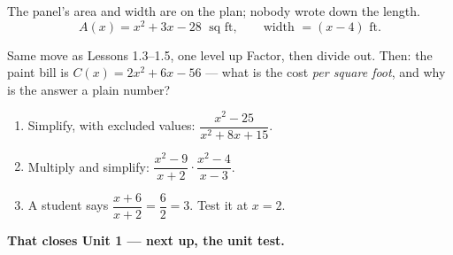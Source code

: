 \documentclass[aspectratio=169, 11pt]{beamer}
\begin{document}
\begin{frame}[t, plain]
  The panel's area and width are on the plan; nobody wrote down the length.
  \[ A(x) = x^2+3x-28 \;\text{ sq ft}, \qquad \text{width } = (x-4) \text{ ft.} \]
  \begin{block}{Same move as Lessons 1.3--1.5, one level up}
    Factor, then divide out. Then: the paint bill is $C(x)=2x^2+6x-56$ --- what is the cost
    \emph{per square foot}, and why is the answer a plain number?
  \end{block}
\end{frame}

\begin{frame}[t, plain]
  \begin{enumerate}
    \setlength{\itemsep}{0.35cm}
    \item Simplify, with excluded values: \; $\dfrac{x^2-25}{x^2+8x+15}$.
    \item Multiply and simplify: \; $\dfrac{x^2-9}{x+2} \cdot \dfrac{x^2-4}{x-3}$.
    \item A student says $\dfrac{x+6}{x+2} = \dfrac62 = 3$. Test it at $x=2$.
  \end{enumerate}
  \vspace{0.3cm}
  {\color{royal}\bfseries That closes Unit 1 --- next up, the unit test.}
\end{frame}
\end{document}
